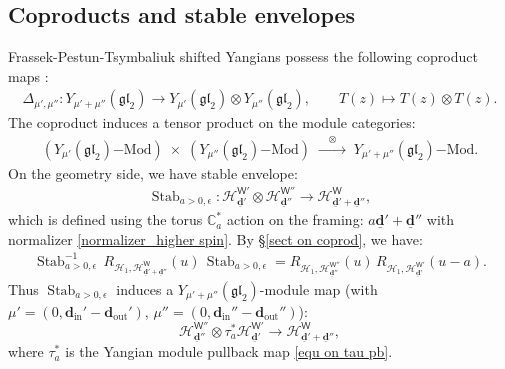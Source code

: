 \documentclass[10pt]{amsart}
\theoremstyle{definition}
\numberwithin{equation}{section}
\newcommand{\bC}{\mathbb{C}}
\newcommand{\bd}{\mathbf{d}}
\newcommand{\sW}{\mathsf{W}}
\newcommand{\sw}{\mathsf{w}}
\newcommand{\Stab}{\operatorname{Stab}}
\newcommand{\tr}{\operatorname{tr}}
\newcommand{\In}{\operatorname{in}}
\newcommand{\Out}{\operatorname{out}}
\begin{document}

\subsection{Coproducts and stable envelopes}

Frassek-Pestun-Tsymbaliuk shifted Yangians possess the following coproduct maps \cite[Prop.~2.316]{FPT}:
\begin{align*}
    \Delta_{\mu',\mu''}\colon Y_{\mu'+\mu''}(\mathfrak{gl}_2)\to Y_{\mu'}(\mathfrak{gl}_2)\otimes Y_{\mu''}(\mathfrak{gl}_2),\qquad T(z)\mapsto T(z)\otimes T(z).
\end{align*}
The coproduct induces a tensor product on the module categories:
\begin{align*}
    \left(Y_{\mu'}(\mathfrak{gl}_2)\mathrm{-Mod}\right)\;\times \; \left(Y_{\mu''}(\mathfrak{gl}_2)\mathrm{-Mod}\right)\;\xrightarrow{\quad\otimes\quad} \; Y_{\mu'+\mu''}(\mathfrak{gl}_2)\mathrm{-Mod}.
\end{align*}
On the geometry side, we have stable envelope:
\begin{align*}
    \Stab_{a>0,\epsilon}\colon \mathcal H^{\sW'}_{\underline{\bd}'}\otimes \mathcal H^{\sW''}_{\underline{\bd}''}\longrightarrow \mathcal H^{\sW}_{\underline{\bd}'+\underline{\bd}''},
\end{align*}
which is defined using the torus $\bC^*_a$ action on the framing: $a\underline{\bd}'+\underline{\bd}''$ with normalizer \eqref{normalizer_higher spin}. 
By \S \ref{sect on coprod}, we have: 
\begin{align*}
    \Stab_{a>0,\epsilon}^{-1}\,R_{\mathcal H_1,\mathcal H^{\sW}_{\underline{\bd}'+\underline{\bd}''}}(u)\,\Stab_{a>0,\epsilon}=  R_{\mathcal H_1,\mathcal H^{\sW''}_{\underline{\bd}''}}(u)\,R_{\mathcal H_1,\mathcal H^{\sW'}_{\underline{\bd}'}}(u-a).
\end{align*}
Thus $\Stab_{a>0,\epsilon}$ induces a $Y_{\mu'+\mu''}(\mathfrak{gl}_2)$-module map (with $\mu'=(0,\bd_{\In}'-\bd_{\Out}')$, $\mu''=(0,\bd_{\In}''-\bd_{\Out}'')$): 
$$\mathcal H^{\sW''}_{\underline{\bd}''}\otimes\tau_{a}^*\mathcal H^{\sW'}_{\underline{\bd}'}\to \mathcal H^{\sW}_{\underline{\bd}'+\underline{\bd}''}, $$
where $\tau_{a}^*$ is the Yangian module pullback map \eqref{equ on tau pb}. 
\end{document}
